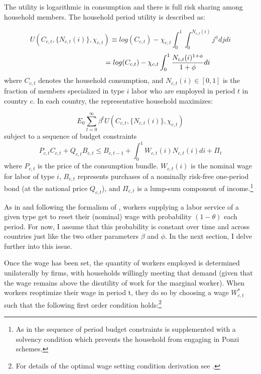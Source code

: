 \documentclass[12pt]{article}
\begin{document}
\begin{appendices}
The utility is logarithmic in consumption and there is full risk sharing among household members. The household period utility is described as:

    \begin{equation*}
        U(C_{c,t},\{N_{c,t}(i)\}, \chi_{c,t}) \equiv log(C_{c,t}) - \chi_{c,t} \int_0^1 \int_0^{N_{c,t}(i)} j^{\phi} dj di
    \end{equation*}
    \begin{equation*}
        \indent \indent \indent \indent \indent  = log(C_{c,t}) - \chi_{c,t} \int_0^1 \dfrac{N_{c,t}(i)^{1+\phi}}{1+\phi} di
    \end{equation*}
where $C_{c,t}$ denotes the household consumption, and $N_{c,t}(i) \in [0,1]$ is the fraction of members specialized in type $i$ labor who are employed in period $t$ in country $c$. In each country, the representative household maximizes:

\begin{equation*}
    E_0 \sum_{t=0}^{\infty} \beta^t U(C_{c,t},\{N_{c,t}(i)\}, \chi_{c,t})
\end{equation*}
subject to a sequence of budget constraints
\begin{equation*}
    P_{c,t} C_{c,t} + Q_{c,t} B_{c,t} \leq B_{c,t-1} + \int_0^1 W_{c,t}(i) N_{c,t}(i) di + \Pi_t
\end{equation*}
where $P_{c,t}$ is the price of the consumption bundle. $W_{c,t}(i)$ is the nominal wage for labor of type $i$, $B_{c,t}$ represents purchases of a nominally risk-free one-period bond (at the national price $Q_{c,t}$), and $\Pi_{c,t}$ is a lump-sum component of income.\footnote{As in \cite{Gali2011} the sequence of period budget constraints is supplemented with a solvency condition which prevents the household from engaging in Ponzi schemes.}


As in \cite{Erceg2000} and following the formalism of \cite{Calvo1983}, workers supplying a labor service of a given type get to reset their (nominal) wage with probability $(1-\theta)$ each period. For now, I assume that this probability is constant over time and across countries just like the two other parameters $\beta$ and $\phi$. In the next section, I delve further into this issue.

Once the wage has been set, the quantity of workers employed is determined unilaterally by firms, with households willingly meeting that demand (given that the wage remains above the disutility of work for the marginal worker). When workers reoptimize their wage in period t, they do so by choosing a wage $W_{c,t}^*$ such that the following first order condition holds:\footnote{For details of the optimal wage setting condition derivation see \cite{Erceg2000}.}


\end{appendices}
\end{document}

